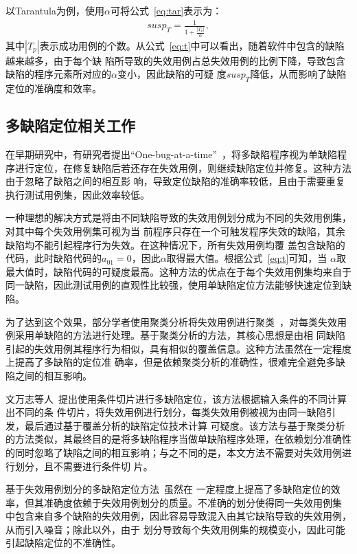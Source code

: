 以Tarantula\cite{jones2005empirical}为例，使用$\alpha$可将公式~\ref{eq:tar}表示为：
\begin{eqnarray}
 susp_T = \frac{1}{1+\frac{|T_p|}{\alpha}}, \label{eq:t}
\end{eqnarray}
其中$|T_p|$表示成功用例的个数。从公式~\ref{eq:t}中可以看出，随着软件中包含的缺陷越来越多，由于每个缺
陷所导致的失效用例占总失效用例的比例下降，导致包含缺陷的程序元素所对应的$\alpha$变小，因此缺陷的可疑
度$susp_T$降低，从而影响了缺陷定位的准确度和效率。

\subsection{多缺陷定位相关工作}
在早期研究中，有研究者提出``One-bug-at-a-time''~\cite{klahr1988cognitive}，将多缺陷程序视为单缺陷程
序进行定位，在修复缺陷后若还存在失效用例，则继续缺陷定位并修复。这种方法由于忽略了缺陷之间的相互影
响，导致定位缺陷的准确率较低，且由于需要重复执行测试用例集，因此效率较低。

一种理想的解决方式是将由不同缺陷导致的失效用例划分成为不同的失效用例集，对其中每个失效用例集可视为当
前程序只存在一个可触发程序失效的缺陷，其余缺陷均不能引起程序行为失效。在这种情况下，所有失效用例均覆
盖包含缺陷的代码，此时缺陷代码的$a_{01}=0$，因此$\alpha$取得最大值。根据公式~\ref{eq:t}可知，当
$\alpha$取最大值时，缺陷代码的可疑度最高。这种方法的优点在于每个失效用例集均来自于同一缺陷，因此测试用例的直观性比较强，使用单缺陷定位方法能够快速定位到缺陷。

为了达到这个效果，部分学者使用聚类分析将失效用例进行聚类~\cite{jones2007debugging,
zheng2006statistical}，对每类失效用例采用单缺陷的方法进行处理。基于聚类分析的方法，其核心思想是由相
同缺陷引起的失效用例其程序行为相似，具有相似的覆盖信息。这种方法虽然在一定程度上提高了多缺陷的定位准
确率，但是依赖聚类分析的准确性，很难完全避免多缺陷之间的相互影响。

文万志等人~\cite{conslice2013}提出使用条件切片进行多缺陷定位，该方法根据输入条件的不同计算出不同的条
件切片，将失效用例进行划分，每类失效用例被视为由同一缺陷引发，最后通过基于覆盖分析的缺陷定位技术计算
可疑度。该方法与基于聚类分析的方法类似，其最终目的是将多缺陷程序当做单缺陷程序处理，在依赖划分准确性
的同时忽略了缺陷之间的相互影响；与之不同的是，本文方法不需要对失效用例进行划分，且不需要进行条件切
片。

基于失效用例划分的多缺陷定位方法~\cite{zheng2006statistical, jones2007debugging, conslice2013}虽然在
一定程度上提高了多缺陷定位的效率，但其准确度依赖于失效用例划分的质量。不准确的划分使得同一失效用例集
中包含来自多个缺陷的失效用例，因此容易导致混入由其它缺陷导致的失效用例，从而引入噪音；除此以外，由于
划分导致每个失效用例集的规模变小，因此可能引起缺陷定位的不准确性。

